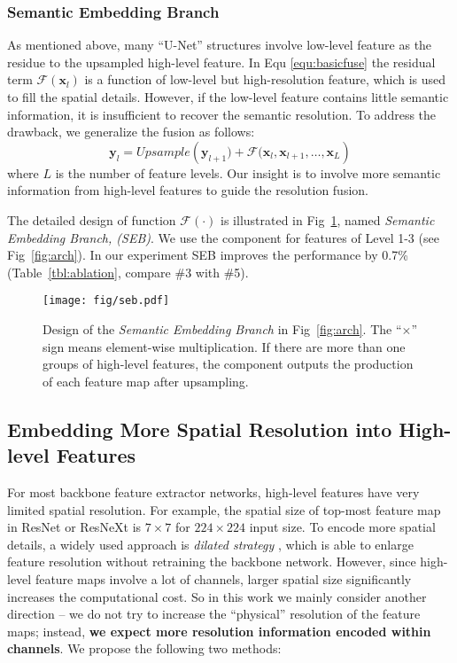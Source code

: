 \documentclass[runningheads]{llncs}
\begin{document}
\subsubsection{Semantic Embedding Branch}

As mentioned above, many ``U-Net'' structures involve low-level feature as the residue to the upsampled high-level feature. In Equ \ref{equ:basicfuse} the residual term $\mathcal{F}(\mathbf{x}_l)$ is a function of low-level but high-resolution feature, which is used to fill the spatial details. However, if the low-level feature contains little semantic information, it is insufficient to recover the semantic resolution. To address the drawback, we generalize the fusion as follows:
\begin{equation}
\mathbf{y}_l=Upsample\left(\mathbf{y}_{l+1})+\mathcal{F}(\mathbf{x}_l,\mathbf{x}_{l+1}, \ldots, \mathbf{x}_{L}\right)
\label{equ:semanticfuse}
\end{equation}
where $L$ is the number of feature levels. Our insight is to involve more semantic information from high-level features to guide the resolution fusion. 

The detailed design of function $\mathcal{F}\left(\cdot\right)$ is illustrated in Fig~\ref{fig:semanticembeddingbranch}, named \emph{Semantic Embedding Branch, (SEB)}. We use the component for features of Level 1-3 (see Fig~\ref{fig:arch}). In our experiment SEB improves the performance by 0.7\% (Table~\ref{tbl:ablation}, compare \#3 with \#5).

\begin{figure}
	\centering
	\texttt{[image: fig/seb.pdf]}
	\caption{Design of the \emph{Semantic Embedding Branch} in Fig~\ref{fig:arch}. The ``$\times$'' sign means element-wise multiplication. If there are more than one groups of high-level features, the component outputs the production of each feature map after upsampling. }
	\label{fig:semanticembeddingbranch}
\end{figure}


\subsection{Embedding More Spatial Resolution into High-level Features}
\label{sec:tohighlevel}

For most backbone feature extractor networks, high-level features have very limited spatial resolution. For example, the spatial size of top-most feature map in ResNet or ResNeXt is $7\times 7$ for $224\times 224$ input size. To encode more spatial details, a widely used approach is \emph{dilated strategy} \cite{Yu2015Multi,Chen2016DeepLab,Chen2017Rethinking,Wang2017Understanding,Zhao2016Pyramid,Chen2014Semantic}, which is able to enlarge feature resolution without retraining the backbone network. However, since high-level feature maps involve a lot of channels, larger spatial size significantly increases the computational cost. So in this work we mainly consider another direction -- we do not try to increase the ``physical'' resolution of the feature maps; instead, \textbf{we expect more resolution information encoded within channels}. We propose the following two methods:
\end{document}
